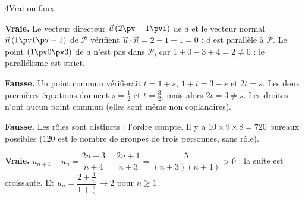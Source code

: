 \begin{corrigeBac}{4}{Vrai ou faux}
\begin{questions}
  \item \textbf{Vraie.} Le vecteur directeur $\vec u\,(2\pv-1\pv1)$ de $d$ et le vecteur normal $\vec n\,(1\pv1\pv-1)$ de $\mathcal{P}$
    vérifient $\vec u\cdot\vec n=2-1-1=0$ : $d$ est parallèle à $\mathcal{P}$. Le point $(1\pv0\pv3)$ de $d$ n'est pas dans $\mathcal{P}$,
    car $1+0-3+4=2\neq0$ : le parallélisme est strict. \pts{1 pt}
  \item \textbf{Fausse.} Un point commun vérifierait $t=1+s$, $1+t=3-s$ et $2t=s$. Les deux premières équations donnent $s=\frac12$ et
    $t=\frac32$, mais alors $2t=3\neq s$. Les droites n'ont aucun point commun (elles sont même non coplanaires). \pts{1 pt}
  \item \textbf{Fausse.} Les rôles sont distincts : l'ordre compte. Il y a $10\times9\times8=720$ bureaux possibles ($120$ est le nombre de
    groupes de trois personnes, sans rôle). \pts{1 pt}
  \item \textbf{Vraie.} $u_{n+1}-u_n=\dfrac{2n+3}{n+4}-\dfrac{2n+1}{n+3}=\dfrac{5}{(n+3)(n+4)}>0$ : la suite est croissante. Et
    $u_n=\dfrac{2+\frac1n}{1+\frac3n}\to2$ pour $n\geq1$. \pts{1 pt}
\end{questions}
\end{corrigeBac}

